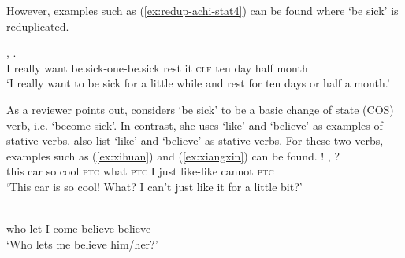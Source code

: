\label{ex:redup-actV}

\label{ex:redup-semel}
\z
\z

However, examples such as (\ref{ex:redup-achi-stat4}) can be found where  `be sick' is reduplicated.

\ea\label{ex:redup-achi-stat4}
\gll {}   ,       .\\
I really want be.sick-one-be.sick rest it \textsc{clf} ten day half month\\ 
\glt `I really want to be sick for a little while and rest for ten days or half a month.'
\z

As a reviewer points out, \citet[Sec. 3.3]{Tham2013} considers   `be sick' to be a basic change of state (COS) verb, i.e. `become sick'.
In contrast, she uses  `like' and  `believe' as examples of stative verbs.
\citet[680]{PeckEtAl2013} also list  `like' and  `believe' as stative verbs.
For these two verbs, examples such as (\ref{ex:xihuan}) and (\ref{ex:xiangxin}) can be found.
\ea\label{ex:xihuan}%
\gll {}    !  ,     ?\\
this car so cool \textsc{ptc} what \textsc{ptc} I just like-like cannot \textsc{ptc}\\
\glt `This car is so cool! What? I can't just like it for a little bit?'

\ex\label{ex:xiangxin}%
\gll {}    \\
who let I come believe-believe\\
\glt `Who lets me believe him/her?'
\z

